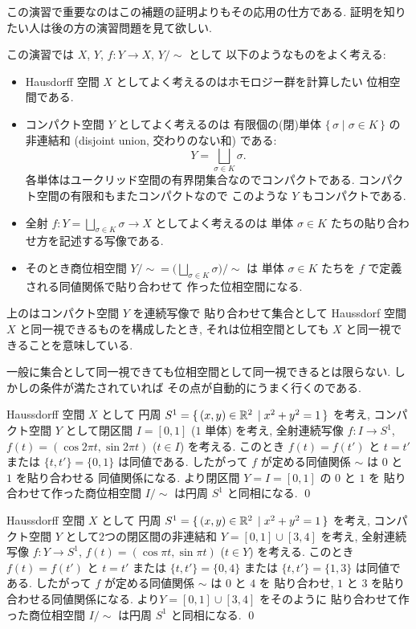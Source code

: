 \documentclass[12pt,twoside]{jarticle}
\begin{document}
この演習で重要なのはこの補題の証明よりもその応用の仕方である.
証明を知りたい人は後の方の演習問題を見て欲しい.

この演習では $X$, $Y$, $f:Y\to X$, $Y/\sim$ として
以下のようなものをよく考える:
\begin{itemize}
\item Hausdorff 空間 $X$ としてよく考えるのはホモロジー群を計算したい
  位相空間である.
\item コンパクト空間 $Y$ としてよく考えるのは
  有限個の(閉)単体 $\{\, \sigma \mid \sigma\in K\,\}$ の非連結和
  (disjoint union, 交わりのない和) である:
  \begin{equation*}
    Y = \bigsqcup_{\sigma\in K}\sigma.
  \end{equation*}
  各単体はユークリッド空間の有界閉集合なのでコンパクトである. 
  コンパクト空間の有限和もまたコンパクトなので
  このような $Y$ もコンパクトである.
\item 全射 $f:Y=\bigsqcup_{\sigma\in K} \sigma\to X$ としてよく考えるのは
  単体 $\sigma\in K$ たちの貼り合わせ方を記述する写像である.
\item そのとき商位相空間 $Y/{\sim} 
  = \bigl(\bigsqcup_{\sigma\in K}\sigma\bigr)\big/{\sim}$ は
  単体 $\sigma\in K$ たちを $f$ で定義される同値関係で貼り合わせて
  作った位相空間になる.
\end{itemize}
上のはコンパクト空間 $Y$ を連続写像で
貼り合わせて集合として Haussdorf 空間 $X$ と同一視できるものを構成したとき, 
それは位相空間としても $X$ と同一視できることを意味している.

一般に集合として同一視できても位相空間として同一視できるとは限らない.
しかしの条件が満たされていれば
その点が自動的にうまく行くのである.

\begin{example}
  \label{example:I-S^1}
  Haussdorff 空間 $X$ として
  円周 $S^1=\{\,(x,y)\in{\mathbb R}^2\,\mid x^2+y^2=1\,\}$ を考え, 
  コンパクト空間 $Y$ として閉区間 $I=[0,1]$ ($1$ 単体) を考え,
  全射連続写像 $f:I\to S^1$, $f(t)=(\cos 2\pi t, \sin 2\pi t)$ 
  ($t\in I$) を考える.
  このとき $f(t)=f(t')$ と $t=t'$ または $\{t,t'\}=\{0,1\}$ は同値である.
  したがって $f$ が定める同値関係 $\sim$ は $0$ と $1$ を貼り合わせる
  同値関係になる.
  より閉区間 $Y=I=[0,1]$ の $0$ と $1$ を
  貼り合わせて作った商位相空間 $I/{\sim}$ は円周 $S^1$ と同相になる.
  \qed
\end{example}

\begin{example}
  \label{example:I+I-S^1}
  Haussdorff 空間 $X$ として
  円周 $S^1=\{\,(x,y)\in{\mathbb R}^2\,\mid x^2+y^2=1\,\}$ を考え, 
  コンパクト空間 $Y$ として2つの閉区間の非連結和 $Y=[0,1]\cup[3,4]$ を考え,
  全射連続写像 $f:Y\to S^1$, $f(t)=(\cos \pi t, \sin \pi t)$ 
  ($t\in Y$) を考える.
  このとき $f(t)=f(t')$ と $t=t'$ または $\{t,t'\}=\{0,4\}$ 
  または $\{t,t'\}=\{1,3\}$ は同値である.
  したがって $f$ が定める同値関係 $\sim$ は $0$ と $4$ を
  貼り合わせ, $1$ と $3$ を貼り合わせる同値関係になる.
  より$Y=[0,1]\cup[3,4]$ をそのように
  貼り合わせて作った商位相空間 $I/{\sim}$ は円周 $S^1$ と同相になる.
  \qed
\end{example}
\end{document}

